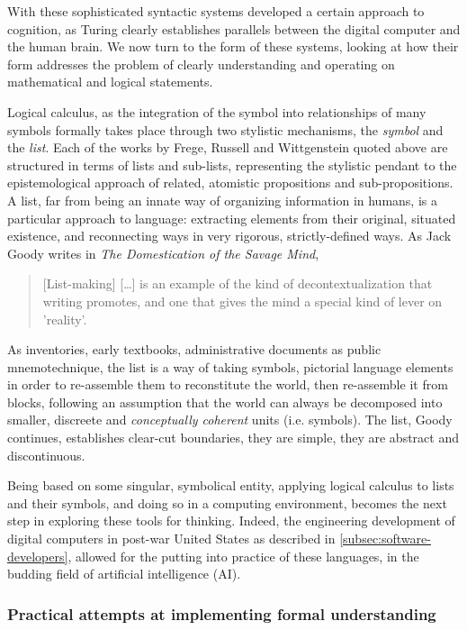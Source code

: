 With these sophisticated syntactic systems developed a certain approach to cognition, as Turing clearly establishes parallels between the digital computer and the human brain. We now turn to the form of these systems, looking at how their form addresses the problem of clearly understanding and operating on mathematical and logical statements.

Logical calculus, as the integration of the symbol into relationships of many symbols formally takes place through two stylistic mechanisms, the \emph{symbol} and the \emph{list}. Each of the works by Frege, Russell and Wittgenstein quoted above are structured in terms of lists and sub-lists, representing the stylistic pendant to the epistemological approach of related, atomistic propositions and sub-propositions. A list, far from being an innate way of organizing information in humans, is a particular approach to language: extracting elements from their original, situated existence, and reconnecting ways in very rigorous, strictly-defined ways. As Jack Goody writes in \emph{The Domestication of the Savage Mind},

\begin{quote}
    [List-making] [\dots] is an example of the kind of decontextualization that writing promotes, and one that gives the mind a special kind of lever on 'reality'. \citep{goody_domestication_1977}
\end{quote}

As inventories, early textbooks, administrative documents as public mnemotechnique, the list is a way of taking symbols, pictorial language elements in order to re-assemble them to reconstitute the world, then re-assemble it from blocks, following an assumption that the world can always be decomposed into smaller, discreete and \emph{conceptually coherent} units (i.e. symbols). The list, Goody continues, establishes clear-cut boundaries, they are simple, they are abstract and discontinuous.

Being based on some singular, symbolical entity, applying logical calculus to lists and their symbols, and doing so in a computing environment, becomes the next step in exploring these tools for thinking. Indeed, the engineering development of digital computers in post-war United States as described in \ref{subsec:software-developers}, allowed for the putting into practice of these languages, in the budding field of artificial intelligence (AI).

\subsubsection{Practical attempts at implementing formal understanding}
\label{subsubsec:practical-understanding}

